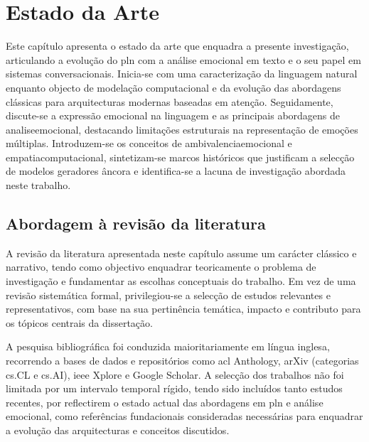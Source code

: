 
\chapter{Estado da Arte}
\label{chap:Chapter2}

Este capítulo apresenta o estado da arte que enquadra a presente investigação, articulando a evolução do \gls{pln} com a análise emocional em texto e o seu papel em sistemas conversacionais. Inicia-se com uma caracterização da linguagem natural enquanto objecto de modelação computacional e da evolução das abordagens clássicas para arquitecturas modernas baseadas em atenção. Seguidamente, discute-se a expressão emocional na linguagem e as principais abordagens de \gls{analiseemocional}, destacando limitações estruturais na representação de emoções múltiplas. Introduzem-se os conceitos de \gls{ambivalenciaemocional} e \gls{empatiacomputacional}, sintetizam-se marcos históricos que justificam a selecção de modelos geradores âncora e identifica-se a lacuna de investigação abordada neste trabalho.


\section{Abordagem à revisão da literatura}
\label{sec:abordagem_revisao}

A revisão da literatura apresentada neste capítulo assume um carácter clássico e narrativo, tendo como objectivo enquadrar teoricamente o problema de investigação e fundamentar as escolhas conceptuais do trabalho. Em vez de uma revisão sistemática formal, privilegiou-se a selecção de estudos relevantes e representativos, com base na sua pertinência temática, impacto e contributo para os tópicos centrais da dissertação.

A pesquisa bibliográfica foi conduzida maioritariamente em língua inglesa, recorrendo a bases de dados e repositórios como \gls{acl} Anthology, arXiv (categorias cs.CL e cs.AI), \gls{ieee} Xplore e Google Scholar. A selecção dos trabalhos não foi limitada por um intervalo temporal rígido, tendo sido incluídos tanto estudos recentes, por reflectirem o estado actual das abordagens em \gls{pln} e análise emocional, como referências fundacionais consideradas necessárias para enquadrar a evolução das arquitecturas e conceitos discutidos.

